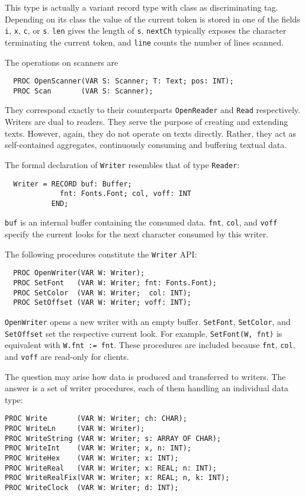 This type is actually a variant record type with class as discriminating tag.
Depending on its class the value of the current token is stored in one of the fields
\verb|i|, \verb|x|, \verb|c|, or \verb|s|.  \verb|len| gives the length of \verb|s|,
\verb|nextCh| typically exposes the character terminating the current token, and
\verb|line| counts the number of lines scanned.

The operations on scanners are
\begin{verbatim}
  PROC OpenScanner(VAR S: Scanner; T: Text; pos: INT);
  PROC Scan       (VAR S: Scanner);
\end{verbatim}

They correspond exactly to their counterparts \verb|OpenReader| and \verb|Read| respectively.
Writers are dual to readers.  They serve the purpose of creating and extending texts.
However, again, they do not operate on texts directly.  Rather,
they act as self-contained aggregates, continuously consuming and buffering textual data.

The formal declaration of \verb|Writer| resembles that of type \verb|Reader|:
\begin{verbatim}
  Writer = RECORD buf: Buffer;
             fnt: Fonts.Font; col, voff: INT
           END;
\end{verbatim}

\verb|buf| is an internal buffer containing the consumed data.
\verb|fnt|, \verb|col|, and \verb|voff| specify the current looks
for the next character consumed by this writer.

The following procedures constitute the \verb|Writer| API:
\begin{verbatim}
  PROC OpenWriter(VAR W: Writer);
  PROC SetFont   (VAR W: Writer; fnt: Fonts.Font);
  PROC SetColor  (VAR W: Writer;  col: INT);
  PROC SetOffset (VAR W: Writer; voff: INT);
\end{verbatim}

\verb|OpenWriter| opens a new writer with an empty buffer.
\verb|SetFont|, \verb|SetColor|, and \verb|SetOffset| set the respective current look.
For example, \verb|SetFont(W, fnt)| is equivalent with \verb|W.fnt := fnt|.
These procedures are included because
\verb|fnt|, \verb|col|, and \verb|voff| are read-only for clients.

The question may arise how data is produced and transferred to writers.
The answer is a set of writer procedures, each of them handling an individual data type:
\begin{verbatim}
PROC Write       (VAR W: Writer; ch: CHAR);
PROC WriteLn     (VAR W: Writer);
PROC WriteString (VAR W: Writer; s: ARRAY OF CHAR);
PROC WriteInt    (VAR W: Writer; x, n: INT);
PROC WriteHex    (VAR W: Writer; x: INT);
PROC WriteReal   (VAR W: Writer; x: REAL; n: INT);
PROC WriteRealFix(VAR W: Writer; x: REAL; n, k: INT);
PROC WriteClock  (VAR W: Writer; d: INT);
\end{verbatim}


